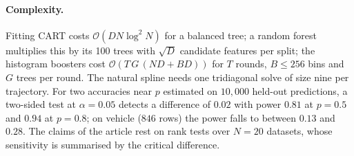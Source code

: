 \documentclass[pdflatex,sn-mathphys]{sn-jnl}
\theoremstyle{thmstyleone}
\theoremstyle{thmstyletwo}
\theoremstyle{thmstylethree}
\begin{document}
\begin{appendices}
\paragraph{Complexity.} Fitting CART costs $\mathcal{O}(DN\log^{2}N)$ for a balanced tree; a random forest multiplies this by its 100 trees with $\sqrt D$ candidate features per split; the histogram boosters cost $\mathcal{O}(T\,G\,(ND+BD))$ for $T$ rounds, $B\le256$ bins and $G$ trees per round. The natural spline needs one tridiagonal solve of size nine per trajectory. For two accuracies near $p$ estimated on $10{,}000$ held-out predictions, a two-sided test at $\alpha=0.05$ detects a difference of $0.02$ with power $0.81$ at $p=0.5$ and $0.94$ at $p=0.8$; on vehicle ($846$ rows) the power falls to between $0.13$ and $0.28$. The claims of the article rest on rank tests over $N=20$ datasets, whose sensitivity is summarised by the critical difference.

\end{appendices}
\end{document}
